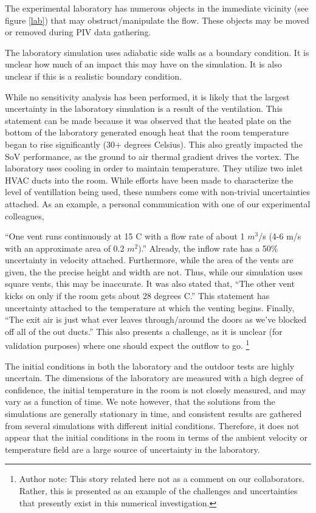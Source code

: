 \documentclass{article}
\begin{document}
The experimental laboratory has numerous objects
in the immediate vicinity (see figure \ref{lab}) that may
obstruct/manipulate the flow. These objects may be moved or removed
during PIV data gathering. 

The laboratory simulation uses adiabatic side walls as a boundary
condition. It is unclear how much of an impact this may have on the
simulation. It is also unclear if this is a realistic boundary
condition. 

While no sensitivity analysis has been performed, it is likely that the
largest uncertainty in the laboratory simulation is a result of the
ventilation. This statement can be made because it was observed that the
heated plate on the bottom of the laboratory generated enough heat that
the room temperature began to rise significantly (30+ degrees
Celsius). This also greatly impacted the SoV performance, as the ground
to air thermal gradient drives the vortex. The laboratory uses cooling
in order to maintain temperature. They utilize two inlet HVAC ducts into
the room. While efforts have been made to characterize the level of
ventillation being used, these numbers come with non-trivial
uncertainties attached. As an example, a personal communication with one
of our experimental colleagues, 

``One vent runs continuously at 15 C with a flow rate of about 1
$m^3$/s (4-6 m/s with an approximate area of 0.2 $m^2$).''
Already, the inflow rate has a 50\% uncertainty in velocity
attached. Furthermore, while the area of the vents are given, the the
precise height and width are not. Thus, while our simulation uses square
vents, this may be inaccurate. 
It was also stated that, ``The other vent kicks on only if the
room gets about 28 degrees C.'' This statement has uncertainty attached to the
temperature at which the venting begins. Finally, ``The exit air is just
what ever leaves through/around the doors as we've blocked off all of
the out ducts.'' This also presents a challenge, as it is unclear (for
validation purposes) where one should expect the outflow to
go. \footnote{\normalsize Author note: This story related here not as a comment on
our collaborators. Rather, this is presented as an example of the challenges
and uncertainties that presently exist in this numerical investigation.}

The initial conditions in both the laboratory and the outdoor
tests are highly uncertain. The dimensions of the laboratory are
measured with a high degree of confidence, the initial temperature
in the room is not closely measured, and may vary as a function of
time. We note however, that the solutions from the simulations are
generally stationary in time, and consistent results are gathered from several
simulations with different initial conditions. Therefore, it does not
appear that the initial conditions in the room in terms of the ambient
velocity or temperature field are a large source of uncertainty in the
laboratory.
\end{document}
